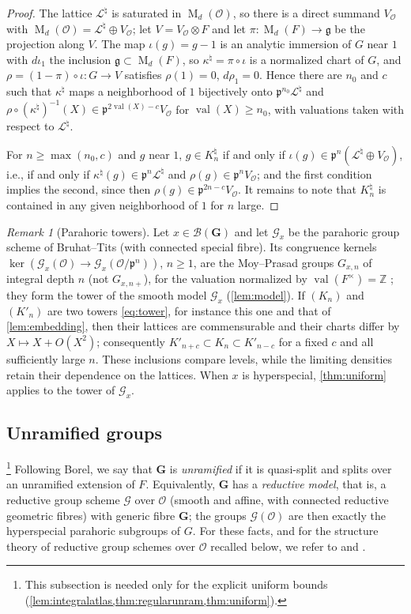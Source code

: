 \documentclass[11pt,reqno]{amsart}
\numberwithin{equation}{section}
\theoremstyle{plain}
\theoremstyle{definition}
\theoremstyle{remark}
\newtheorem{remark}[theorem]{Remark}
\theoremstyle{plain}
\newcommand{\Z}{\mathbb{Z}}      %
\newcommand{\OO}{\mathcal{O}}    %
\newcommand{\pp}{\mathfrak{p}}   %
\newcommand{\Lat}{\mathcal{L}}   %
\newcommand{\bG}{\mathbf{G}}     %
\newcommand{\g}{\mathfrak{g}}    %
\newcommand{\cG}{\mathcal{G}}                   %
\newcommand{\Bldg}{\mathcal{B}}                 %
\DeclareMathOperator{\val}{val}
\DeclareMathOperator{\Mat}{M}
\newcommand{\nchart}{normalized chart}
\begin{document}
\begin{proof}
The lattice $\Lat^\natural$ is saturated in $\Mat_d(\OO)$, so there is
a direct summand $V_{\OO}$ with $\Mat_d(\OO)=\Lat^\natural\oplus V_{\OO}$;
let $V=V_{\OO}\otimes F$ and let $\pi:\Mat_d(F)\to\g$ be the projection
along $V$. The map $\iota(g)=g-1$ is an analytic immersion of $G$ near
$1$ with $d\iota_1$ the inclusion $\g\subset\Mat_d(F)$, so
$\kappa^\natural=\pi\circ\iota$ is a \nchart{} of $G$, and $\rho=(1-\pi)\circ\iota:G\to V$ satisfies
$\rho(1)=0$, $d\rho_1=0$. Hence there are $n_0$ and $c$ such that
$\kappa^\natural$ maps a neighborhood of $1$ bijectively onto
$\pp^{n_0}\Lat^\natural$ and
$\rho\circ(\kappa^\natural)^{-1}(X)\in\pp^{2\val(X)-c}V_{\OO}$
for $\val(X)\ge n_0$, with valuations taken with respect to
$\Lat^\natural$.

For $n\ge\max(n_0,c)$ and $g$ near $1$, $g\in K^\natural_n$ if and only if
$\iota(g)\in\pp^n(\Lat^\natural\oplus V_{\OO})$, i.e., if and only if
$\kappa^\natural(g)\in\pp^n\Lat^\natural$ and $\rho(g)\in\pp^nV_{\OO}$;
and the first condition implies the second, since then
$\rho(g)\in\pp^{2n-c}V_{\OO}$. It remains to note that $K^\natural_n$ is
contained in any given neighborhood of $1$ for $n$ large.
\end{proof}

\begin{remark}[Parahoric towers]\label{rem:badplaces}
Let $x\in\Bldg(\bG)$ and let $\cG_x$ be the parahoric group scheme of
Bruhat--Tits (with connected special fibre). Its congruence kernels
$\ker(\cG_x(\OO)\to\cG_x(\OO/\pp^n))$, $n\ge1$, are the Moy--Prasad groups
$G_{x,n}$ of integral depth $n$ (not $G_{x,n+}$), for the
valuation normalized by $\val(F^\times)=\Z$ \cite[Proposition~8.5.16]{MR4520154};
they form the tower of the smooth model $\cG_x$ (\cref{lem:model}). If $(K_n)$ and
$(K'_n)$ are two towers \eqref{eq:tower}, for instance this one and that of
\cref{lem:embedding}, then their lattices are commensurable and their charts
differ by $X\mapsto X+O(X^2)$; consequently $K'_{n+c}\subset K_n\subset
K'_{n-c}$ for a fixed $c$ and all sufficiently large $n$. These inclusions compare levels, while the limiting
densities retain their dependence on the lattices. When $x$ is hyperspecial,
\cref{thm:uniform} applies to the tower of $\cG_x$.
\end{remark}

\subsection{Unramified groups}\label{sec:integraldata}\footnote{This subsection is needed only for the explicit uniform bounds
(\cref{lem:integralatlas,thm:regularunram,thm:uniform}).}
Following Borel, we say that $\bG$ is \emph{unramified} if
it is quasi-split and splits over an unramified extension of $F$.
Equivalently, $\bG$ has a \emph{reductive model}, that is, a reductive group
scheme $\cG$ over $\OO$ (smooth and affine, with connected reductive geometric
fibres) with generic fibre $\bG$; the groups $\cG(\OO)$ are then exactly the
hyperspecial parahoric subgroups of $G$. For these facts, and for the
structure theory of reductive group schemes over $\OO$ recalled below, we
refer to \cite{MR3362641} and \cite{MR4520154}.
\end{document}
